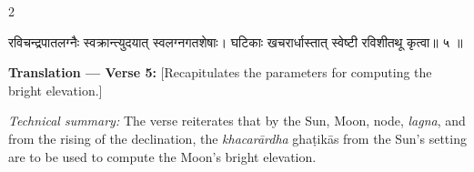 \documentclass[11pt,a4paper]{article}
\newcommand{\dev}[1]{{\devanagarifont #1}}
\newenvironment{sanskritverse}{%
  \begin{center}\begin{minipage}{0.95\textwidth}
  \setlength{\leftskip}{1em}
  \setlength{\rightskip}{1em}
  \dev
}{\end{minipage}\end{center}}
\begin{document}
\begin{paracol}{2}

\begin{sanskritverse}
रविचन्द्रपातलग्नैः स्वक्रान्त्युदयात् स्वलग्नगतशेषाः।
घटिकाः खचरार्धास्तात् स्वेष्टी रविशीतथू कृत्वा॥ ५ ॥
\end{sanskritverse}

\switchcolumn

\textbf{Translation — Verse 5:} [Recapitulates the parameters for computing the bright elevation.]

\textit{Technical summary:} The verse reiterates that by the Sun, Moon, node, \textit{lagna}, and from the rising of the declination, the \textit{khacarārdha} ghaṭikās from the Sun's setting are to be used to compute the Moon's bright elevation.

\end{paracol}

\vspace{0.5em}
\end{document}
